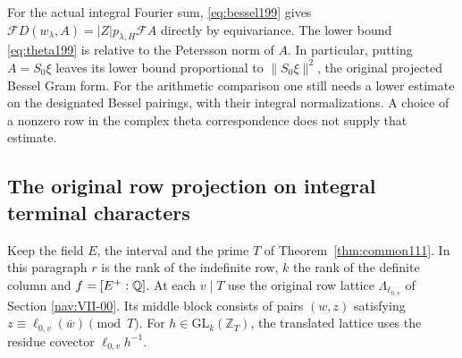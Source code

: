\documentclass[a4paper,11pt]{article}
\theoremstyle{definition}
\theoremstyle{remark}
\newcommand{\ZZ}{\mathbb Z}\newcommand{\ord}{\operatorname{ord}}
\numberwithin{equation}{section}
\begin{document}
For the actual integral Fourier sum, \eqref{eq:bessel199} gives
\(\mathcal F D(w_\lambda,A)=|Z|p_{\lambda,H}\mathcal F A\)
directly by equivariance. The lower bound \eqref{eq:theta199}
is relative to the Petersson norm of \(A\). In particular,
putting \(A=S_0\xi\) leaves its lower bound proportional to
\(\|S_0\xi\|^2\), the original projected Bessel Gram form.
For the arithmetic comparison one still needs a lower estimate
on the designated Bessel pairings, with their integral
normalizations. A choice of a nonzero row in the complex
theta correspondence does not supply that estimate.

\subsection{The original row projection on integral terminal characters}\label{nav:VIII-28}
Keep the field \(E\), the interval and the prime \(T\) of Theorem~\ref{thm:common111}. In this paragraph \(r\) is the rank of the indefinite row,
\(k\) the rank of the definite column and \(f=[E^+:\mathbb Q]\).
At each \(v\mid T\) use the original row lattice
\(\Lambda_{\ell_{0,v}}\) of
Section \ref{nav:VII-00}.
Its middle block consists of pairs \((w,z)\) satisfying
\(z\equiv\ell_{0,v}(\bar w)\pmod T\).
For \(h\in\mathrm{GL}_k(\ZZ_T)\), the translated lattice uses the
residue covector \(\ell_{0,v}h^{-1}\).
\end{document}
